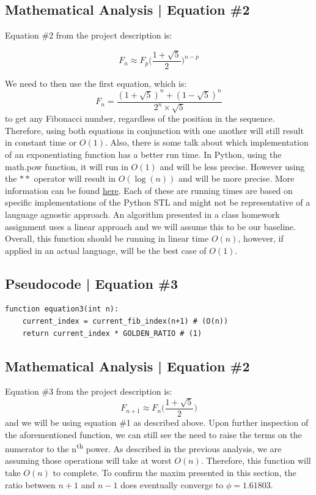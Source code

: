 \documentclass{article}
\begin{document}
\subsection{Mathematical Analysis | Equation \#2}
\begin{flushleft}
Equation \#2 from the project description is:

$$F_{n} \approx F_{p}\bigg(\frac{1 + \sqrt{5}}{2}\bigg)^{n - p}$$

We need to then use the first equation, which is:
$$ F_{n} = \frac{(1 + \sqrt{5})^{n} + (1 - \sqrt{5})^{n}}{2^{n} \times \sqrt{5}}$$
to get any Fibonacci number, regardless of the position in the sequence.
Therefore, using both equations in conjunction with one another will still result in constant time or $O(1)$.
Also, there is some talk about which implementation of an exponentiating function has a better run time.
In Python, using the math.pow function, it will run in $O(1)$ and will be less precise.
However using the $**$ operator will result in $O(\log(n))$ and will be more precise.
More information can be found \href{https://stackoverflow.com/questions/48839772/why-is-time-complexity-o1-for-powx-y-while-it-is-on-for-xy}{\underline{here}}.
Each of these are running times are based on specific implementations of the Python STL and might not be representative of a language agnostic approach.
An algorithm presented in a class homework assignment uses a linear approach and we will assume this to be our baseline.
Overall, this function should be running in linear time $O(n)$, however, if applied in an actual language, will be the best case of $O(1)$.
\end{flushleft}

\newpage

\subsection{Pseudocode | Equation \#3}

\begin{verbatim}
function equation3(int n):
    current_index = current_fib_index(n+1) # (O(n))
    return current_index * GOLDEN_RATIO # (1)

\end{verbatim}

\subsection{Mathematical Analysis | Equation \#2}
\begin{flushleft}
Equation \#3 from the project description is:
$$F_{n+1} \approx F_{n}\bigg(\frac{1 + \sqrt{5}}{2}\bigg)$$
and we will be using equation \#1 as described above.
Upon further inspection of the aforementioned function, we can still see the need to raise the terms on the numerator to the n\textsuperscript{th} power.
As described in the previous analysis, we are assuming those operations will take at worst $O(n)$.
Therefore, this function will take $O(n)$ to complete.
To confirm the maxim presented in this section, the ratio between $n+1$ and $n-1$ does eventually converge to $\phi = 1.61803$.
\end{flushleft}
\end{document}
